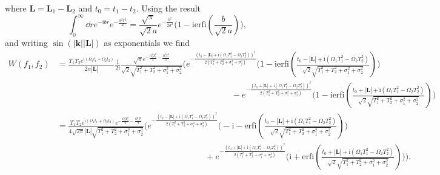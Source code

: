 \documentclass[letterpaper,12pt,titlepage,oneside,final]{book}
\newcommand{\ii}{\mathrm{i}}
\begin{document}
where $\bm L = \bm L_1 - \bm L_2$ and $t_0 = t_1-t_2$. Using the result
\begin{equation}
    \int_0^\infty \dd r e^{- \ii b r}e^{- \frac{a^2r^2}{2}} = \frac{\sqrt{\pi}}{\sqrt{2}a}e^{- \frac{b^2}{2a^2}}\Big(1 - \ii \text{erfi}\left(\frac{b}{\sqrt{2}a}\right)\Big),
\end{equation}
and writing $\sin(|\bm k||\bm L|)$ as exponentials we find{\footnotesize
\begin{align}
     W(f_1,f_2) &= \frac{T_1T_2e^{\ii (\Omega_1 t_1+\Omega_2 t_2)}}{2\pi|\bm L|}  \frac{1}{2\ii}\frac{\sqrt{\pi}e^{- \frac{\Omega_2^2 T_2^2}{2} - \frac{\Omega_1^2 T_1^2}{2}}}{\sqrt{2} \sqrt{T_1^2 + T_2^2 + \sigma_1^2 + \sigma_2^2}}\Bigg(e^{- \frac{(t_0 - |\bm L|+\ii (\Omega_1 T_1^2- \Omega_2 T_2^2))^2}{2(T_1^2 + T_2^2 + \sigma_1^2 + \sigma_2^2)}}\Bigg(1 - \ii \text{erfi}\left(\tfrac{t_0 - |\bm L|+\ii (\Omega_1 T_1^2- \Omega_2 T_2^2)}{\sqrt{2}\sqrt{T_1^2 + T_2^2 + \sigma_1^2 + \sigma_2^2}}\right)\Bigg)\nonumber\\
     &\:\:\:\:\:\:\:\:\:\:\:\:\:\:\:\:\:\:\:\:\:\:\:\:\:\:\:\:\:\:\:\:\:\:\:\:\:\:\:\:\:\:\:\:\:\:\:\:\:\:\:\:\:\:\:\:\:\:\:\:\:\:\:\:\:\:\:\:\:\:\:\:\:\:\:\:\:\:\:\:\:\:\:\:\:\:\:\:\:\:\:\:\:-e^{- \frac{(t_0 + |\bm L|+\ii (\Omega_1 T_1^2- \Omega_2 T_2^2))^2}{2(T_1^2 + T_2^2 + \sigma_1^2 + \sigma_2^2)}}\Bigg(1 - \ii \text{erfi}\left(\tfrac{t_0 + |\bm L|+\ii (\Omega_1 T_1^2- \Omega_2 T_2^2)}{\sqrt{2}\sqrt{T_1^2 + T_2^2 + \sigma_1^2 + \sigma_2^2}}\right)\Bigg)\nonumber\\
     &= \frac{T_1T_2e^{\ii (\Omega_1 t_1+\Omega_2 t_2)}e^{- \frac{\Omega_2^2 T_2^2}{2} - \frac{\Omega_1^2 T_1^2}{2}}}{4\sqrt{2\pi}|\bm L|\sqrt{T_1^2 + T_2^2 + \sigma_1^2 + \sigma_2^2}} \Bigg(e^{- \frac{(t_0 - |\bm L|+\ii (\Omega_1 T_1^2- \Omega_2 T_2^2))^2}{2(T_1^2 + T_2^2 + \sigma_1^2 + \sigma_2^2)}}\Bigg(-\ii - \text{erfi}\left(\tfrac{t_0 - |\bm L|+\ii (\Omega_1 T_1^2- \Omega_2 T_2^2)}{\sqrt{2}\sqrt{T_1^2 + T_2^2 + \sigma_1^2 + \sigma_2^2}}\right)\Bigg)\nonumber\\
     &\:\:\:\:\:\:\:\:\:\:\:\:\:\:\:\:\:\:\:\:\:\:\:\:\:\:\:\:\:\:\:\:\:\:\:\:\:\:\:\:\:\:\:\:\:\:\:\:\:\:\:\:\:\:\:\:\:\:\:\:\:\:\:\:\:\:\:\:\:\:\:\:\:\:\:\:\:\:\:+e^{- \frac{(t_0 + |\bm L|+\ii (\Omega_1 T_1^2- \Omega_2 T_2^2))^2}{2(T_1^2 + T_2^2 + \sigma_1^2 + \sigma_2^2)}}\Bigg(\ii + \text{erfi}\left(\tfrac{t_0 + |\bm L|+\ii (\Omega_1 T_1^2- \Omega_2 T_2^2)}{\sqrt{2}\sqrt{T_1^2 + T_2^2 + \sigma_1^2 + \sigma_2^2}}\right)\Bigg)\Bigg).
\end{align}}
\end{document}

